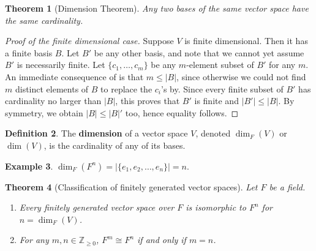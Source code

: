 \documentclass[12pt]{report}
\newtheorem{theorem}{Theorem}[chapter]
\numberwithin{equation}{section}
\numberwithin{theorem}{chapter}
\theoremstyle{definition}
\newtheorem{definition}[theorem]{Definition}
\newtheorem{example}[theorem]{Example}
\newtheorem*{basic properties}{Basic Properties}
\newtheorem*{Important Remark}{Important Remark}
\newcommand{\df}[1]{{\bf #1}\index{#1}}
\newcommand{\Z}{\mathbb{Z}}
\begin{document}
\begin{theorem}[Dimension Theorem]\label{thm1116a}
Any two bases of the same vector space have the same cardinality.
\end{theorem}


\begin{proof}[Proof of the finite dimensional case]
Suppose $V$ is finite dimensional. Then it has a finite basis $B$. Let $B'$ be any other basis, and note that we cannot yet assume $B'$ is necessarily finite. Let $\{c_1, \dots, c_m\}$ be any $m$-element subset of $B'$ for any $m$. An immediate consequence of  is that $m \leqslant |B|$, since otherwise we could not find $m$ distinct elements of $B$ to replace the $c_i$'s by. 
Since every finite subset of $B'$ has cardinality no larger than $|B|$, this proves that $B'$ is finite and $|B'| \leqslant |B|$. By symmetry, we obtain $|B| \leqslant |B|'$ too, hence equality follows.
\end{proof}


\begin{definition}
 The \df{dimension} of a vector space $V$, denoted $\dim_F(V)$ or $\dim(V)$, is the cardinality of any of its bases.
 \end{definition}
 
 \begin{example}
 $\dim_F(F^n) = |\{e_1,e_2,\ldots,e_n\}| = n.$
 \end{example}
 



 
\begin{theorem}[Classification of finitely generated vector spaces]\label{classification of fg vector spaces}
 Let $F$ be a field. 
\begin{enumerate}[label=(\arabic*),itemsep=0mm]
\item Every finitely generated vector space over $F$ is isomorphic to $F^n$ for $n=\dim_F(V)$. 
\item For any $m,n \in \Z_{\geqslant 0}$,  $F^m \cong F^n$ if and only if $m = n$.
\end{enumerate}
\end{theorem}
\end{document}
